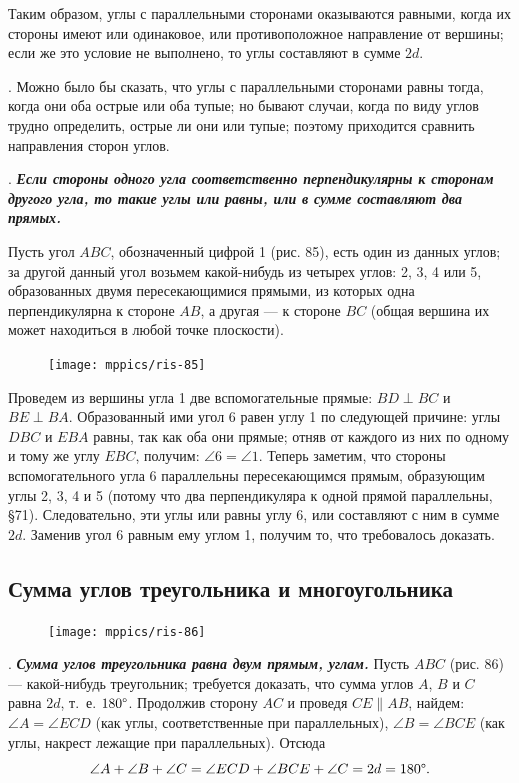 \documentclass[oneside]{book}
\begin{document}
Таким образом, углы с параллельными сторонами оказываются равными, когда их стороны имеют или одинаковое, или противоположное направление от вершины;
если же это условие не выполнено, то углы составляют в сумме $2d$.

.
Можно было бы сказать, что углы с параллельными сторонами равны тогда, когда они оба острые или оба тупые;
но бывают случаи, когда по виду углов трудно определить, острые ли они или тупые;
поэтому приходится сравнить направления сторон углов.

.
\textbf{\emph{Если стороны одного угла соответственно перпендикулярны к сторонам другого угла, то такие углы или равны, или в сумме составляют два прямых.}}

Пусть угол $ABC$, обозначенный цифрой 1 (рис. 85), есть один из данных углов;
за другой данный угол возьмем какой-нибудь из четырех углов:
2, 3, 4 или 5, образованных двумя пересекающимися прямыми, из которых одна перпендикулярна к стороне $AB$, а другая — к стороне $BC$ (общая вершина их может находиться в любой точке плоскости).

\begin{figure}
\centering
\texttt{[image: mppics/ris-85]}
\caption{}
\end{figure}

Проведем из вершины угла 1 две вспомогательные прямые:
$BD\perp BC$ и $BE\perp BA$.
Образованный ими угол 6 равен углу 1 по следующей причине:
углы $DBC$ и $EBA$ равны, так как оба они прямые;
отняв от каждого из них по одному и тому же углу $EBC$, получим: $\angle 6 = \angle 1$.
Теперь заметим, что стороны вспомогательного угла 6 параллельны пересекающимся прямым, образующим углы 2, 3, 4 и 5 (потому что два перпендикуляра к одной прямой параллельны, §71). 
Следовательно, эти углы или равны углу 6, или составляют с ним в сумме $2d$.
Заменив угол 6 равным ему углом 1, получим то, что требовалось доказать.

\subsection*{Сумма углов треугольника и многоугольника}

\begin{figure}
\centering
\texttt{[image: mppics/ris-86]}
\caption{}
\end{figure}

.
\textbf{\emph{Сумма углов треугольника равна двум прямым, углам.}}
Пусть $ABC$ (рис. 86) — какой-нибудь треугольник;
требуется доказать, что сумма углов $A$, $B$ и $C$ равна $2d$, т.~е. $180\degree$.
Продолжив сторону $AC$ и проведя $CE\parallel AB$, найдем:
$\angle A = \angle ECD$ (как углы, соответственные при параллельных), $\angle B = \angle BCE$ (как углы, накрест лежащие при параллельных). 
Отсюда
\[\angle A + \angle B+\angle C = \angle ECD + \angle BCE + \angle C = 2d =180\degree.\]
\end{document}
